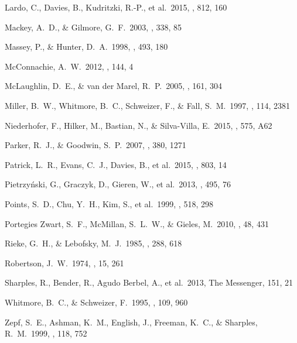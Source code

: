 \documentclass[useAMS,usenatbib]{mn2e}
\begin{document}
\begin{thebibliography}{99}
 Lardo, C., Davies, B.,
Kudritzki, R.-P., et al.\ 2015, \apj, 812, 160


 Mackey, A.~D., \& Gilmore, G.~F.\ 2003, \mnras, 338, 85

 Massey, P., \& Hunter, D.~A.\ 1998, \apj, 493, 180

 McConnachie, A.~W.\ 2012,
\aj, 144, 4

 McLaughlin, D.~E., \& van der Marel, R.~P.\ 2005, \apjs, 161, 304

 Miller, B.~W., Whitmore,
B.~C., Schweizer, F., \& Fall, S.~M.\ 1997, \aj, 114, 2381

 Niederhofer, F., Hilker, M., Bastian, N., \& Silva-Villa, E.\ 2015, \aap, 575, A62

 Parker, R.~J., \& Goodwin, S.~P.\ 2007, \mnras, 380, 1271

 Patrick, L.~R., Evans,
C.~J., Davies, B., et al.\ 2015, \apj, 803, 14

Pietrzy{\'n}ski, G., Graczyk, D., Gieren, W., et al.\ 2013, \nat, 495, 76

 Points, S.~D., Chu,
Y.~H., Kim, S., et al.\ 1999, \apj, 518, 298

 Portegies Zwart, S.~F., McMillan, S.~L.~W., \& Gieles, M.\ 2010, \araa, 48, 431

 Rieke, G.~H., \& Lebofsky, M.~J.\ 1985, \apj, 288, 618


 Robertson, J.~W.\ 1974, \aaps, 15, 261


 Sharples, R., Bender,
R., Agudo Berbel, A., et al.\ 2013, The Messenger, 151, 21


 Whitmore, B.~C., \& Schweizer, F.\ 1995, \aj, 109, 960

 Zepf, S.~E., Ashman,
K.~M., English, J., Freeman, K.~C., \& Sharples, R.~M.\ 1999, \aj, 118, 752
\end{thebibliography}
\label{lastpage}
\end{document}
